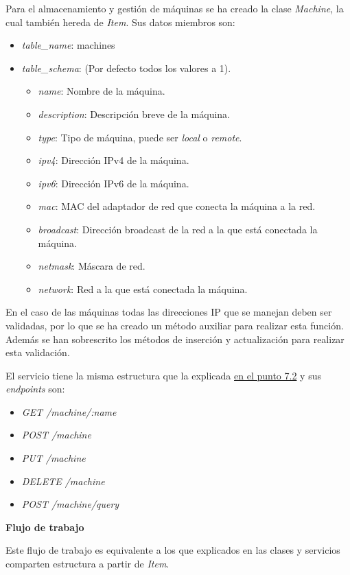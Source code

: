 Para el almacenamiento y gestión de máquinas se ha creado la clase \textit{Machine}, la cual también hereda de \textit{Item}. Sus datos miembros son:
\begin{itemize}
	\item \textit{table\_name}: machines
	\item \textit{table\_schema}: (Por defecto todos los valores a 1).
	\begin{itemize}
		\item \textit{name}: Nombre de la máquina.
		\item \textit{description}: Descripción breve de la máquina.
		\item \textit{type}: Tipo de máquina, puede ser \textit{local} o \textit{remote}.
		\item \textit{ipv4}: Dirección IPv4 de la máquina.
		\item \textit{ipv6}: Dirección IPv6 de la máquina.
		\item \textit{mac}: MAC del adaptador de red que conecta la máquina a la red.
		\item \textit{broadcast}: Dirección broadcast de la red a la que está conectada la máquina.
		\item \textit{netmask}: Máscara de red.
		\item \textit{network}: Red a la que está conectada la máquina.
	\end{itemize}
\end{itemize}


\bigskip
En el caso de las máquinas todas las direcciones IP que se manejan deben ser validadas, por lo que se ha creado un método auxiliar para realizar esta función. Además se han sobrescrito los métodos de inserción y actualización para realizar esta validación.

\bigskip
El servicio tiene la misma estructura que la explicada \hyperref[sec:servicios]{en el punto 7.2} y sus \textit{endpoints} son:
\begin{itemize}
	\item \textit{GET /machine/:name}
	\item \textit{POST /machine}
	\item \textit{PUT /machine}
	\item \textit{DELETE /machine}
	\item \textit{POST /machine/query}
\end{itemize}

\bigskip
\textbf{Flujo de trabajo}

Este flujo de trabajo es equivalente a los que explicados en las clases y servicios comparten estructura a partir de \textit{Item}.



